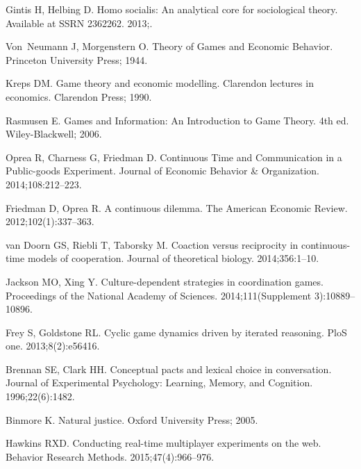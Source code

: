 \documentclass[10pt,letterpaper]{article}
\begin{document}
\begin{thebibliography}{10}
Gintis H, Helbing D.
\newblock Homo socialis: An analytical core for sociological theory.
\newblock Available at SSRN 2362262. 2013;.

Von~Neumann J, Morgenstern O.
\newblock Theory of Games and Economic Behavior.
\newblock Princeton University Press; 1944.

Kreps DM.
\newblock Game theory and economic modelling.
\newblock Clarendon lectures in economics. Clarendon Press; 1990.

Rasmusen E.
\newblock Games and Information: An Introduction to Game Theory.
\newblock 4th ed. Wiley-Blackwell; 2006.

Oprea R, Charness G, Friedman D.
\newblock Continuous Time and Communication in a Public-goods Experiment.
\newblock Journal of Economic Behavior \& Organization. 2014;108:212--223.

Friedman D, Oprea R.
\newblock A continuous dilemma.
\newblock The American Economic Review. 2012;102(1):337--363.

van Doorn GS, Riebli T, Taborsky M.
\newblock Coaction versus reciprocity in continuous-time models of cooperation.
\newblock Journal of theoretical biology. 2014;356:1--10.

Jackson MO, Xing Y.
\newblock Culture-dependent strategies in coordination games.
\newblock Proceedings of the National Academy of Sciences. 2014;111(Supplement
  3):10889--10896.

Frey S, Goldstone RL.
\newblock Cyclic game dynamics driven by iterated reasoning.
\newblock PloS one. 2013;8(2):e56416.

Brennan SE, Clark HH.
\newblock Conceptual pacts and lexical choice in conversation.
\newblock Journal of Experimental Psychology: Learning, Memory, and Cognition.
  1996;22(6):1482.

Binmore K.
\newblock Natural justice.
\newblock Oxford University Press; 2005.

Hawkins RXD.
\newblock Conducting real-time multiplayer experiments on the web.
\newblock Behavior Research Methods. 2015;47(4):966--976.


\end{thebibliography}
\end{document}
